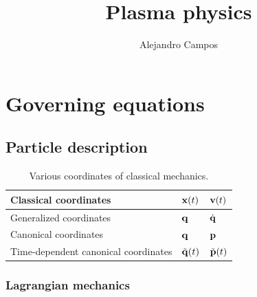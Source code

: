 \documentclass[a4paper,11pt]{report}
\title{Plasma physics}
\author{Alejandro Campos}
\newcommand{\qvecdot}{\dot{\qvec}}
\begin{document}
\maketitle
\tableofcontents

\chapter{Governing equations}

\section{Particle description}
\begin{table}[H]
    \renewcommand{\arraystretch}{1.5}
    \centering
    \caption{Various coordinates of classical mechanics. }
    \label{tb:classical_mechanics_coordinates}
     \begin{tabular}{|l|l|l|}
        \hline
        Classical coordinates & $\mathbf{x}(t)$ & $\mathbf{v}(t)$ \\
        \hline
        Generalized coordinates  & $\mathbf{q}$ & $\qvecdot$ \\
        \hline
        Canonical coordinates & $\mathbf{q}$ & $\mathbf{p}$ \\
        \hline
        Time-dependent canonical coordinates & $\tilde{\mathbf{q}}(t)$ & $ \tilde{\mathbf{p}}(t)$ \\
        \hline
     \end{tabular}
\end{table}
    
\subsection{Lagrangian mechanics}
    
\end{document}
